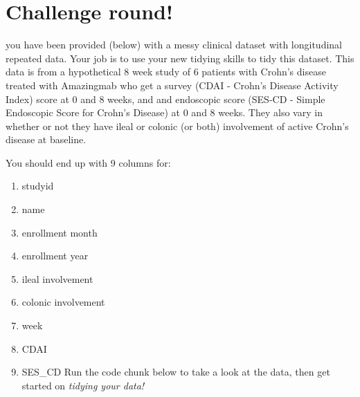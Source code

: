 \documentclass[
]{book}
\providecommand{\tightlist}{%
  \setlength{\itemsep}{0pt}\setlength{\parskip}{0pt}}
\begin{document}
\hypertarget{challenge-round}{%
\section{Challenge round!}\label{challenge-round}}

you have been provided (below) with a messy clinical dataset with longitudinal repeated data. Your job is to use your new tidying skills to tidy this dataset. This data is from a hypothetical 8 week study of 6 patients with Crohn's disease treated with Amazingmab who get a survey (CDAI - Crohn's Disease Activity Index) score at 0 and 8 weeks, and and endoscopic score (SES-CD - Simple Endoscopic Score for Crohn's Disease) at 0 and 8 weeks. They also vary in whether or not they have ileal or colonic (or both) involvement of active Crohn's disease at baseline.

You should end up with 9 columns for:

\begin{enumerate}
\def\labelenumi{\arabic{enumi}.}
\tightlist
\item
  studyid
\item
  name
\item
  enrollment month
\item
  enrollment year
\item
  ileal involvement
\item
  colonic involvement
\item
  week
\item
  CDAI
\item
  SES\_CD
  Run the code chunk below to take a look at the data, then get started on \emph{\emph{tidying your data!}}
\end{enumerate}
\end{document}
